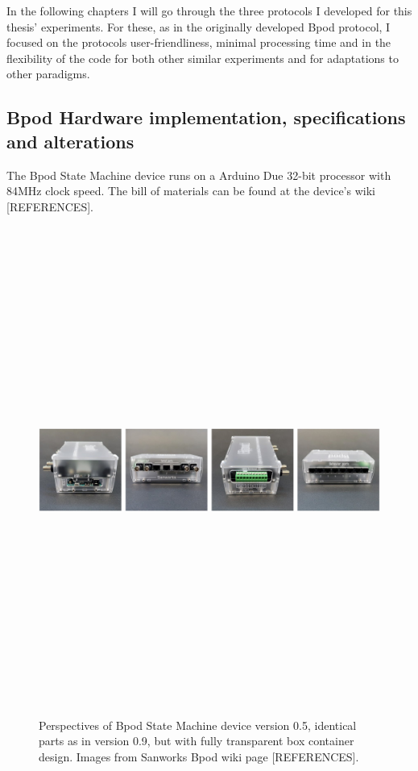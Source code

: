 In the following chapters I will go through the three protocols I developed for this thesis' experiments. For these, as in the originally developed Bpod protocol, I focused on the protocols user-friendliness, minimal processing time and in the flexibility of the code for both other similar experiments and for adaptations to other paradigms.

\subsection{Bpod Hardware implementation, specifications and alterations}
\label{subsec:subbsectionB}

The Bpod State Machine device runs on a Arduino Due 32-bit processor with 84MHz clock speed. The bill of materials can be found at the device's wiki [REFERENCES]. 


\begin{figure}[H] \centering \includegraphics[width=16cm,height=16cm,keepaspectratio]{Figures/3.Chapter/bpodangles.png} 
\caption{Perspectives of Bpod State Machine device version 0.5, identical parts as in version 0.9, but with fully transparent box container design. Images from Sanworks Bpod wiki page [REFERENCES].} 
\end{figure}



